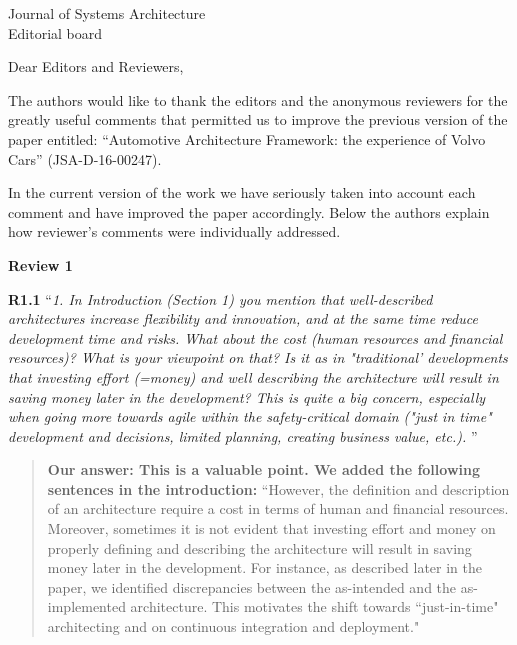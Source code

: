 \documentclass[a4paper,10pt]{letter}
\newcommand{\review}[1]{\hrulefill\par{\Large\textbf{Review #1}}}
\begin{document}
\begin{letter}{Journal of Systems Architecture\\
    Editorial board}

\opening{Dear Editors and Reviewers,}

The authors would like to thank the editors and the anonymous reviewers for the greatly useful comments that permitted us to improve the previous version of the paper entitled: ``Automotive Architecture Framework: the experience of Volvo Cars'' (JSA-D-16-00247). 

In the current version of the work we have seriously taken into account each comment and have improved the paper accordingly. Below the authors explain how reviewer's comments were individually addressed.


\review{1}
%

\textbf{R1.1} ``\textit{1. In Introduction (Section 1) you mention that well-described architectures increase flexibility and innovation, and at the same time reduce development time and risks. What about the cost (human resources and financial resources)? What is your viewpoint on that? Is it as in "traditional' developments that investing effort (=money) and well describing the architecture will result in saving money later in the development? This is quite a big concern, especially when going more towards agile within the safety-critical domain ("just in time" development and decisions, limited planning, creating business value, etc.). }''
\begin{quote}
\textbf{Our answer: This is a valuable point. We added the following sentences in the introduction:}
``However, the definition and description of an architecture require a cost in terms of human and financial resources. Moreover, sometimes it is not evident that investing effort and money on properly defining and describing the architecture will result in saving money later in the development. For instance, as described later in the paper, we identified discrepancies between the as-intended and the as-implemented architecture. This motivates the shift towards ``just-in-time" architecting and on continuous integration and deployment."
\end{quote}


\end{letter}
\end{document}
